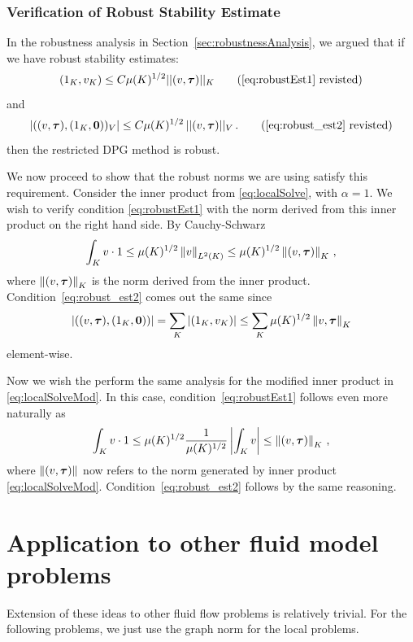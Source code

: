 \documentclass[Proposal.tex]{subfiles}
\begin{document}
\subsubsection{Verification of Robust Stability Estimate}
In the robustness analysis in Section~\ref{sec:robustnessAnalysis}, we argued
that if we have robust stability estimates:
\begin{equation}
(1_K, v_K) \leq C \mu(K)^{1/2} || (v,\bftau) ||_K
\tag{\ref{eq:robustEst1} revisted}
\end{equation}
and
\begin{equation}
| ((v,\bftau),(1_K,{\bf 0}))_V | \leq C \mu(K)^{1/2} \, || (v,\bftau) ||_V\,.
\tag{\ref{eq:robust_est2} revisted}
\end{equation}
then the restricted DPG method is robust.

We now proceed to show that the robust norms we are using satisfy this
requirement.
Consider the inner product from \eqref{eq:localSolve}, with
$\alpha=1$. We wish to
verify condition \eqref{eq:robustEst1} with the norm derived from this inner
product on the right hand side. By Cauchy-Schwarz
\begin{equation}
   \int_K v\cdot
   1\leq\mu(K)^{1/2}\left\| v \right\|_{L^2(K)}\leq\mu(K)^{1/2}\left\| (v,\boldsymbol\tau) \right\|_K\,,
   \label{eq:robustProof}
\end{equation}
where $\left\| (v,\boldsymbol\tau) \right\|_K$ is the norm derived from the inner product.
Condition~\eqref{eq:robust_est2} comes out the same since
$$|(
(v,\boldsymbol\tau),(1_K,{\bf0}))| =
\sum_K|(1_K,v_K)|\leq\sum_K\mu(K)^{1/2}\left\| v,\boldsymbol\tau \right\|_K
$$
element-wise.

Now we wish the perform the same analysis for the modified inner product in
\eqref{eq:localSolveMod}. In this case,
condition~\eqref{eq:robustEst1} follows even more naturally as
\begin{equation}
   \int_K v\cdot1\leq\mu(K)^{1/2}\frac{1}{\mu(K)^{1/2}}\left| \int_Kv \right|
   \leq\left\| (v,\boldsymbol\tau) \right\|_K\,,
   \label{eq:robustProof2}
\end{equation}
where $\left\| (v,\boldsymbol\tau) \right\|$ now refers to the norm generated by inner product
\eqref{eq:localSolveMod}. Condition~\eqref{eq:robust_est2} follows by the same
reasoning.

\section{Application to other fluid model problems}
Extension of these ideas to other fluid flow problems is relatively trivial.
For the following problems, we just use the graph norm for the local problems.
\end{document}

